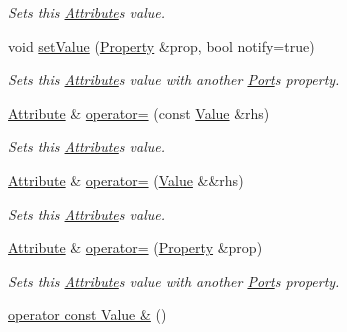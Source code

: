 \begin{DoxyCompactItemize}
\begin{DoxyCompactList}\small\item\em Sets this \hyperlink{classdg_1_1deepcore_1_1_attribute}{Attribute}\textquotesingle{}s value. \end{DoxyCompactList}\item 
void \hyperlink{classdg_1_1deepcore_1_1_attribute_ab82c050c809ed20e579e56e8520e91e0}{set\+Value} (\hyperlink{classdg_1_1deepcore_1_1_property}{Property} \&prop, bool notify=true)
\begin{DoxyCompactList}\small\item\em Sets this \hyperlink{classdg_1_1deepcore_1_1_attribute}{Attribute}\textquotesingle{}s value with another \hyperlink{classdg_1_1deepcore_1_1_port}{Port}\textquotesingle{}s property. \end{DoxyCompactList}\item 
\hyperlink{classdg_1_1deepcore_1_1_attribute}{Attribute} \& \hyperlink{classdg_1_1deepcore_1_1_attribute_a742112882561582b20a7a0ff06710169}{operator=} (const \hyperlink{classdg_1_1deepcore_1_1_value}{Value} \&rhs)
\begin{DoxyCompactList}\small\item\em Sets this \hyperlink{classdg_1_1deepcore_1_1_attribute}{Attribute}\textquotesingle{}s value. \end{DoxyCompactList}\item 
\hyperlink{classdg_1_1deepcore_1_1_attribute}{Attribute} \& \hyperlink{classdg_1_1deepcore_1_1_attribute_a3e8a99326ab9ca9c2622d1551df1a50c}{operator=} (\hyperlink{classdg_1_1deepcore_1_1_value}{Value} \&\&rhs)
\begin{DoxyCompactList}\small\item\em Sets this \hyperlink{classdg_1_1deepcore_1_1_attribute}{Attribute}\textquotesingle{}s value. \end{DoxyCompactList}\item 
\hyperlink{classdg_1_1deepcore_1_1_attribute}{Attribute} \& \hyperlink{classdg_1_1deepcore_1_1_attribute_afbc5d93541a5c91ccfdedfde652c14b8}{operator=} (\hyperlink{classdg_1_1deepcore_1_1_property}{Property} \&prop)
\begin{DoxyCompactList}\small\item\em Sets this \hyperlink{classdg_1_1deepcore_1_1_attribute}{Attribute}\textquotesingle{}s value with another \hyperlink{classdg_1_1deepcore_1_1_port}{Port}\textquotesingle{}s property. \end{DoxyCompactList}\item 
\hyperlink{classdg_1_1deepcore_1_1_attribute_a9b52183a0dd0be7d678bed9659142040}{operator const Value \&} ()

\end{DoxyCompactItemize}

